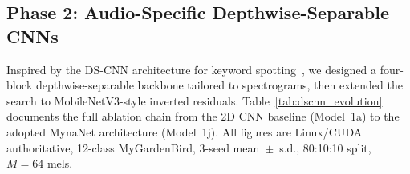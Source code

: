 \documentclass[final,5p,times,twocolumn,nolinenum]{elsarticle}
\begin{document}
\subsection{Phase 2: Audio-Specific Depthwise-Separable CNNs}
\label{sec:dscnn}

Inspired by the DS-CNN architecture for keyword spotting~\cite{zhang2017hello},
we designed a four-block depthwise-separable backbone tailored to
spectrograms, then extended the search to MobileNetV3-style inverted residuals.
Table~\ref{tab:dscnn_evolution} documents the full ablation chain from the
2D CNN baseline (Model~1a) to the adopted MynaNet architecture (Model~1j).
All figures are Linux/CUDA authoritative, 12-class MyGardenBird, 3-seed
mean~$\pm$~s.d., 80:10:10 split, $M=64$ mels.

\begin{table}[ht]
\centering
\caption{Architecture ablation chain (12-class MyGardenBird, Linux/CUDA,
         3-seed mean, 80:10:10, $M=64$).
         $\Delta$ = INT8 change vs.\ previous model in the MCU-compatible
         chain.
         MCU: \checkmark~=~TFLite Micro compatible (Portenta H7);
         $\times$~=~exceeds flash or uses unsupported ops.}
\label{tab:dscnn_evolution}
\end{table}
\end{document}
